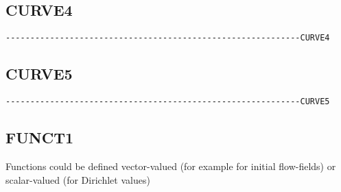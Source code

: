 \subsection{CURVE4}
\begin{verbatim}
------------------------------------------------------------CURVE4
\end{verbatim}


\subsection{CURVE5}
\begin{verbatim}
------------------------------------------------------------CURVE5
\end{verbatim}


\subsection{FUNCT1}

Functions could be defined vector-valued (for example for initial flow-fields)
or scalar-valued (for Dirichlet values)

